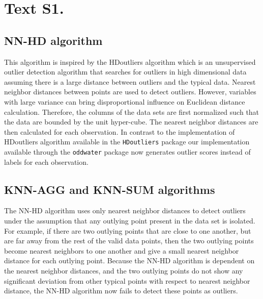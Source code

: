 \documentclass{agujournal2018}
\begin{document}

\section*{Text S1.}



\subsection*{\color{black} NN-HD \color{black} algorithm}\label{hdoutliers-algorithm}

\color{black}This algorithm is inspired by the HDoutliers algorithm \citep{wilkinsonvisualizing} which is an unsupervised outlier detection algorithm that searches for outliers in
high dimensional data assuming there is a large distance between
outliers and the typical data. \color{black} Nearest neighbor distances between points
are used to detect outliers. However, variables with large variance can
bring disproportional influence on Euclidean distance calculation.
Therefore, the columns of the data sets are first normalized such that
the data are bounded by the unit hyper-cube. The nearest neighbor distances are then
calculated for each observation. \color{black} In contrast to the implementation of HDoutliers algorithm available in the \texttt{HDoutliers} package \citep{RHDoutliers2018} our implementation available through the \texttt{oddwater} package now generates outlier scores instead of labels for each observation. \color{black}

\subsection*{KNN-AGG and KNN-SUM
algorithms}\label{knn-agg-and-knn-sum-algorithms}

The \color{black} NN-HD  algorithm uses only nearest neighbor distances to detect
outliers under the assumption that any outlying point present in the data set is isolated. For example, if
there are two outlying points that
are close to one another, but are far away from the rest of the valid
data points, then the two outlying points become nearest neighbors to one another and give a small nearest
neighbor distance for each outlying point. Because the NN-HD algorithm is dependent on the nearest
neighbor distances, and the two outlying points  do not show any significant deviation from other
typical points with respect to nearest neighbor distance, the NN-HD
algorithm now fails to detect these points as outliers. \color{black}
\end{document}
